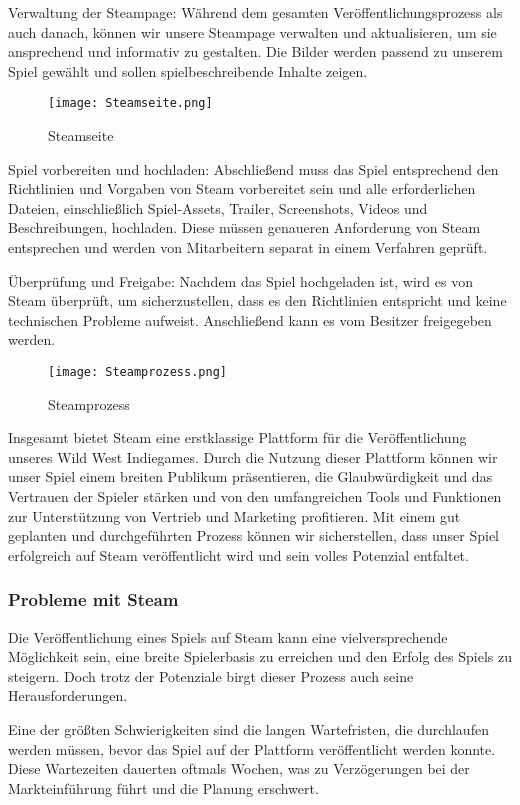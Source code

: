 Verwaltung der Steampage: Während dem gesamten Veröffentlichungsprozess als auch danach, können wir unsere Steampage verwalten und aktualisieren, um sie ansprechend und informativ zu gestalten.
Die Bilder werden passend zu unserem Spiel gewählt und sollen spielbeschreibende Inhalte zeigen.
\begin{figure}[H]
    \texttt{[image: Steamseite.png]}
    \caption{Steamseite}
\end{figure}

Spiel vorbereiten und hochladen:
Abschließend muss das Spiel entsprechend den Richtlinien und Vorgaben von Steam vorbereitet sein und alle erforderlichen Dateien, einschließlich Spiel-Assets, Trailer, Screenshots, Videos und Beschreibungen, hochladen.
Diese müssen genaueren Anforderung von Steam entsprechen und werden von Mitarbeitern separat in einem Verfahren geprüft.

Überprüfung und Freigabe:
Nachdem das Spiel hochgeladen ist, wird es von Steam überprüft, um sicherzustellen, dass es den Richtlinien entspricht und keine technischen Probleme aufweist.
Anschließend kann es vom Besitzer freigegeben werden.
\begin{figure}[H]
    \texttt{[image: Steamprozess.png]}
    \caption{Steamprozess}
\end{figure}

Insgesamt bietet Steam eine erstklassige Plattform für die Veröffentlichung unseres Wild West Indiegames.
Durch die Nutzung dieser Plattform können wir unser Spiel einem breiten Publikum präsentieren, die Glaubwürdigkeit und das Vertrauen der Spieler stärken und von den umfangreichen Tools und Funktionen zur Unterstützung von Vertrieb und Marketing profitieren.
Mit einem gut geplanten und durchgeführten Prozess können wir sicherstellen, dass unser Spiel erfolgreich auf Steam veröffentlicht wird und sein volles Potenzial entfaltet.

 \subsubsection{Probleme mit Steam}\label{subsubsec:Steam-Herausforderungen}
Die Veröffentlichung eines Spiels auf Steam kann eine vielversprechende Möglichkeit sein, eine breite Spielerbasis zu erreichen und den Erfolg des Spiels zu steigern.
Doch trotz der Potenziale birgt dieser Prozess auch seine Herausforderungen.

Eine der größten Schwierigkeiten sind die langen Wartefristen, die durchlaufen werden müssen, bevor das Spiel auf der Plattform veröffentlicht werden konnte.
Diese Wartezeiten dauerten oftmals Wochen, was zu Verzögerungen bei der Markteinführung führt und die Planung erschwert.

